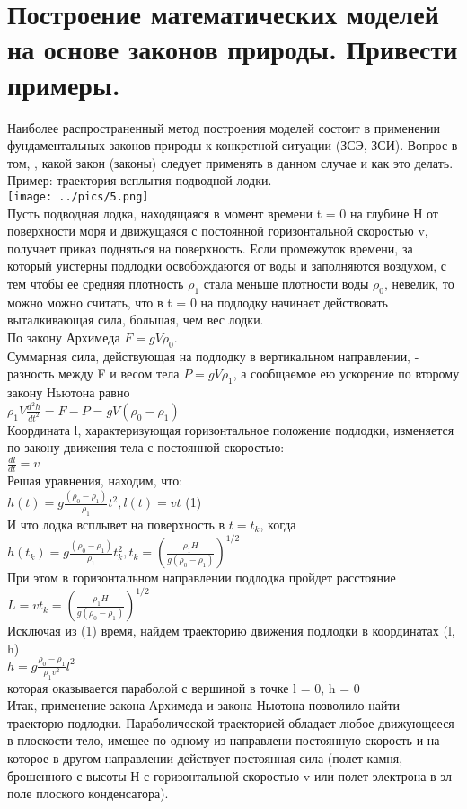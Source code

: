 \documentclass[12pt,a4paper]{article}
\begin{document}
	\section{Построение математических моделей на основе законов природы. Привести примеры.}
	Наиболее распространенный метод построения моделей состоит в применении фундаментальных законов природы к конкретной ситуации (ЗСЭ, ЗСИ). Вопрос в том, , какой закон (законы) следует применять в данном случае и как это делать. \\
	Пример: траектория всплытия подводной лодки.\\
	\texttt{[image: ../pics/5.png]}\\
	Пусть подводная лодка, находящаяся в момент времени  t = 0 на глубине Н от поверхности моря и движущаяся с постоянной горизонтальной скоростью v, получает приказ подняться на поверхность. Если промежуток времени, за который уистерны подлодки освобождаются от воды и заполняются воздухом, с тем чтобы ее средняя плотность $\rho_1$  стала меньше плотности воды $\rho_0$, невелик, то можно можно считать, что в t = 0 на подлодку начинает действовать выталкивающая сила, большая, чем вес лодки. \\
	По закону Архимеда $ F = g V \rho_0$. \\
	Суммарная сила, действующая на подлодку в вертикальном направлении, - разность между F и весом тела $P = g V \rho_1$, а сообщаемое ею ускорение по второму закону Ньютона равно \\
	$\rho_1  V \displaystyle\frac{d^2 h}{d t^2}= F - P = g V (\rho_0 - \rho_1)$\\
	Координата l, характеризующая горизонтальное положение подлодки, изменяется по закону движения тела с постоянной скоростью: \\
	$\displaystyle\frac{d l}{d t} = v$\\
	Решая уравнения, находим, что:\\
	$h(t) = g\displaystyle\frac{(\rho_0-\rho_1)}{\rho_1} t^2 , l(t) = v t$  (1)\\
	И что лодка всплывет на поверхность в $t = t_k$, когда\\
	$h(t_k) = g\displaystyle\frac{(\rho_0-\rho_1)}{\rho_1} t^2_k , t_k = (\frac{\rho_1 H}{g(\rho_0-\rho_1)})^{1/2}$\\
	При этом в горизонтальном направлении подлодка пройдет расстояние\\
	$L = v t_k = (\displaystyle\frac{\rho_1 H}{g(\rho_0-\rho_1)})^{1/2}$\\
	Исключая из (1) время, найдем траекторию движения подлодки в координатах (l, h)\\
	$h = g\displaystyle\frac{\rho_0-\rho_1}{\rho_1 v^2} l^2$	\\
	которая оказывается параболой с вершиной в точке l = 0, h = 0 \\
	Итак, применение закона Архимеда и закона Ньютона позволило найти траекторю подлодки. Параболической траекторией обладает любое движующееся в плоскости тело, имещее по одному из направлени постоянную скорость и на которое в другом направлении действует постоянная сила (полет камня, брошенного с высоты Н с горизонтальной скоростью v или полет электрона в эл поле плоского конденсатора). 
	
\end{document}
